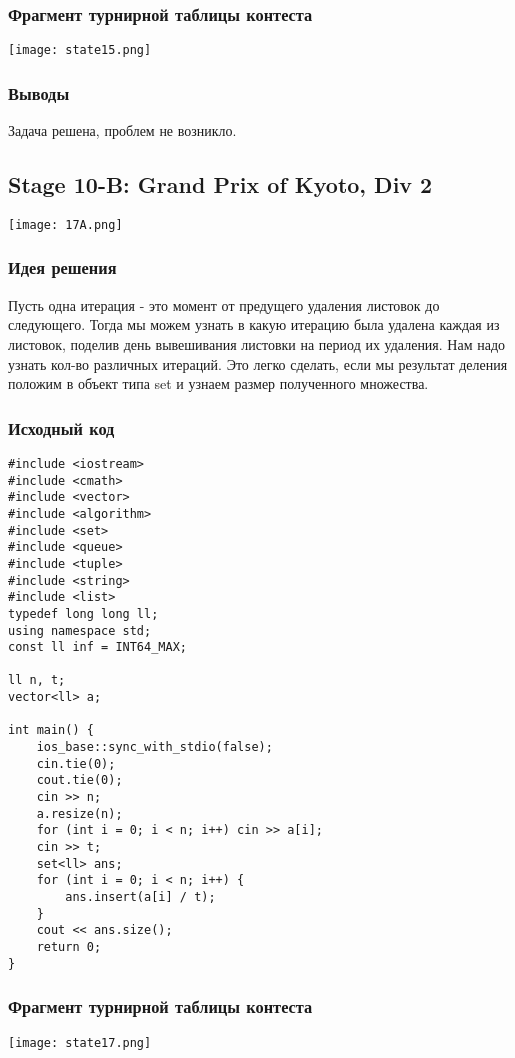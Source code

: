 \documentclass[12pt]{article}
\begin{document}
\subsubsection*{Фрагмент турнирной таблицы контеста}
\begin{center}
\texttt{[image: state15.png]}\newline\noindent
\end{center}

\subsubsection*{Выводы}
Задача решена, проблем не возникло. 
\subsection*{Stage 10-B: Grand Prix of Kyoto, Div 2}
\begin{center}
\texttt{[image: 17A.png]}
\end{center}
\subsubsection*{Идея решения}
Пусть одна итерация - это момент от предущего удаления листовок до следующего. Тогда мы можем узнать в какую итерацию была удалена каждая из листовок, поделив день вывешивания листовки на период их удаления. Нам надо узнать кол-во различных итераций. Это легко сделать, если мы результат деления положим в объект типа set и узнаем размер полученного множества. 
\subsubsection*{Исходный код}
\begin{lstlisting}
#include <iostream>
#include <cmath>
#include <vector>
#include <algorithm>
#include <set>
#include <queue>
#include <tuple>
#include <string>
#include <list>
typedef long long ll;
using namespace std;
const ll inf = INT64_MAX;

ll n, t;
vector<ll> a;

int main() {
	ios_base::sync_with_stdio(false);
	cin.tie(0);
	cout.tie(0);
	cin >> n;
	a.resize(n);
	for (int i = 0; i < n; i++) cin >> a[i];
	cin >> t;
	set<ll> ans;
	for (int i = 0; i < n; i++) {
		ans.insert(a[i] / t);
	}
	cout << ans.size();
	return 0;
}
\end{lstlisting}
\subsubsection*{Фрагмент турнирной таблицы контеста}
\begin{center}
\texttt{[image: state17.png]}\newline\noindent
\end{center}
\end{document}
